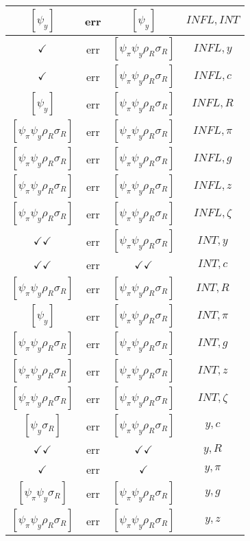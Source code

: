 \documentclass[a4paper,10pt]{article}
\begin{document}
\begin{longtable}{|c|c|c|c|}
\hline
$[\psi_y ]$ & err & $[\psi_y ]$ & ${INFL},{INT}$ \\
\hline
$\checkmark$ & err & $[\psi_\pi \psi_y \rho_R \sigma_R ]$ & ${INFL},{y}$ \\
\hline
$\checkmark$ & err & $[\psi_\pi \psi_y \rho_R \sigma_R ]$ & ${INFL},{c}$ \\
\hline
$[\psi_y ]$ & err & $[\psi_\pi \psi_y \rho_R \sigma_R ]$ & ${INFL},{R}$ \\
\hline
$[\psi_\pi \psi_y \rho_R \sigma_R ]$ & err & $[\psi_\pi \psi_y \rho_R \sigma_R ]$ & ${INFL},{\pi}$ \\
\hline
$[\psi_\pi \psi_y \rho_R \sigma_R ]$ & err & $[\psi_\pi \psi_y \rho_R \sigma_R ]$ & ${INFL},{g}$ \\
\hline
$[\psi_\pi \psi_y \rho_R \sigma_R ]$ & err & $[\psi_\pi \psi_y \rho_R \sigma_R ]$ & ${INFL},{z}$ \\
\hline
$[\psi_\pi \psi_y \rho_R \sigma_R ]$ & err & $[\psi_\pi \psi_y \rho_R \sigma_R ]$ & ${INFL},{\zeta}$ \\
\hline
$\checkmark\checkmark$ & err & $[\psi_\pi \psi_y \rho_R \sigma_R ]$ & ${INT},{y}$ \\
\hline
$\checkmark\checkmark$ & err & $\checkmark\checkmark$ & ${INT},{c}$ \\
\hline
$[\psi_\pi \psi_y \rho_R \sigma_R ]$ & err & $[\psi_\pi \psi_y \rho_R \sigma_R ]$ & ${INT},{R}$ \\
\hline
$[\psi_y ]$ & err & $[\psi_\pi \psi_y \rho_R \sigma_R ]$ & ${INT},{\pi}$ \\
\hline
$[\psi_\pi \psi_y \rho_R \sigma_R ]$ & err & $[\psi_\pi \psi_y \rho_R \sigma_R ]$ & ${INT},{g}$ \\
\hline
$[\psi_\pi \psi_y \rho_R \sigma_R ]$ & err & $[\psi_\pi \psi_y \rho_R \sigma_R ]$ & ${INT},{z}$ \\
\hline
$[\psi_\pi \psi_y \rho_R \sigma_R ]$ & err & $[\psi_\pi \psi_y \rho_R \sigma_R ]$ & ${INT},{\zeta}$ \\
\hline
$[\psi_y \sigma_R ]$ & err & $[\psi_\pi \psi_y \rho_R \sigma_R ]$ & ${y},{c}$ \\
\hline
$\checkmark\checkmark$ & err & $\checkmark\checkmark$ & ${y},{R}$ \\
\hline
$\checkmark$ & err & $\checkmark$ & ${y},{\pi}$ \\
\hline
$[\psi_\pi \psi_y \sigma_R ]$ & err & $[\psi_\pi \psi_y \rho_R \sigma_R ]$ & ${y},{g}$ \\
\hline
$[\psi_\pi \psi_y \rho_R \sigma_R ]$ & err & $[\psi_\pi \psi_y \rho_R \sigma_R ]$ & ${y},{z}$ \\

\end{longtable}
\end{document}
